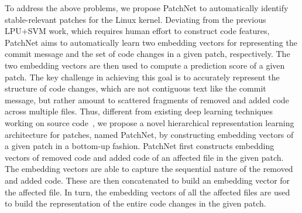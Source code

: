 
To address the above problems, we propose PatchNet to automatically identify
stable-relevant patches for the Linux kernel. Deviating from
the previous LPU+SVM work, which requires human effort to construct code
features, PatchNet aims to automatically learn two embedding vectors for
representing the commit message and the set of code changes in a given
patch, respectively. The two embedding vectors are then used to compute a
prediction score of a given patch. The key challenge in achieving this
goal is to accurately represent the structure of code changes, which are
not contiguous text like the commit message, but rather amount to scattered
fragments of removed and added code across multiple files. 
Thus, different
from existing deep learning techniques working on source
code~\cite{white2016deep,huo2017enhancing,wang2016automatically,
lam2017bug}, 
we propose a
novel hierarchical representation learning architecture for patches, named PatchNet, by constructing embedding vectors of a given patch in a bottom-up fashion. PatchNet first constructs embedding vectors of removed code and added code of an affected file in the given patch. The embedding vectors are able to capture the sequential nature of the removed and added code. These are then concatenated to build an embedding vector for the affected file. In turn, the embedding vectors of all the affected files are used to build the representation of the entire code changes in the given patch.



